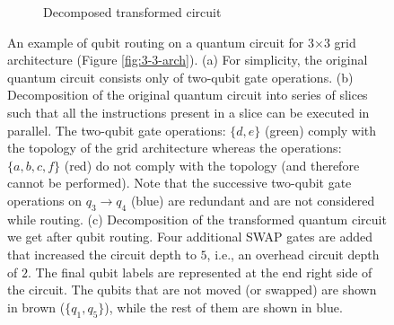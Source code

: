 \begin{figure}
\begin{subfigure}[b]{0.35\linewidth}
        \caption{Decomposed transformed circuit\label{fig:transformed_circ}}
    \end{subfigure}
    \hfill
    \caption{An example of qubit routing on a quantum circuit for 3$\times$3 grid architecture (Figure \ref{fig:3-3-arch}). (a) For simplicity, the original quantum circuit consists only of two-qubit gate operations. (b) Decomposition of the original quantum circuit into series of slices such that all the instructions present in a slice can be executed in parallel. The two-qubit gate operations: $\{d,e\}$ (green) comply with the topology of the grid architecture whereas the operations: $\{a, b, c, f\}$ (red) do not comply with the topology (and therefore cannot be performed). Note that the successive two-qubit gate operations on $q_3\rightarrow q_4$ (blue) are redundant and are not considered while routing. (c) Decomposition of the transformed quantum circuit we get after qubit routing. Four additional SWAP gates are added that increased the circuit depth to $5$, i.e., an overhead circuit depth of $2$. The final qubit labels are represented at the end right side of the circuit. The qubits that are not moved (or swapped) are shown in brown ($\{q_1, q_5\}$), while the rest of them are shown in blue.}
    \label{fig:routing-example}
\end{figure}


